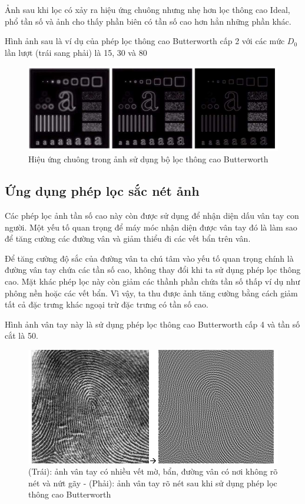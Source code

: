 \documentclass[12pt,a4paper]{report}
\numberwithin{equation}{section}
\theoremstyle{definition} %
\begin{document}
Ảnh sau khi lọc có xảy ra hiệu ứng chuông nhưng nhẹ hơn lọc thông cao Ideal, phổ tần số và ảnh cho thấy phần biên có tần số cao hơn hẳn những phần khác.

Hình ảnh sau là ví dụ của phép lọc thông cao Butterworth cấp 2 với các mức $D_0$ lần lượt (trái sang phải) là 15, 30 và 80

\begin{figure}[H]
\centering
\includegraphics[width=0.8\linewidth]{img/butterworthhighpass/vidu.png}
\caption{Hiệu ứng chuông trong ảnh sử dụng bộ lọc thông cao Butterworth}
\end{figure}

\subsection{Ứng dụng phép lọc sắc nét ảnh}
Các phép lọc ảnh tần số cao này còn được sử dụng để nhận diện dấu vân tay con người. Một yếu tố quan trọng để máy móc nhận diện được vân tay đó là làm sao để tăng cường các đường vân và giảm thiểu đi các vết bẩn trên vân. 

Để tăng cường độ sắc của đường vân ta chú tâm vào yếu tố quan trọng chính là đường vân tay chứa các tần số cao, không thay đổi khi ta sử dụng phép lọc thông cao. Mặt khác phép lọc này còn giảm các thầnh phần chứa tần số thấp ví dụ như phông nền hoặc các vết bẩn. Vì vậy, ta thu được ảnh tăng cường bằng cách giảm tất cả đặc trưng khác ngoại trừ đặc trưng có tần số cao.

Hình ảnh vân tay này là sử dụng phép lọc thông cao Butterworth cấp 4 và tần số cắt là 50.

\begin{figure}[H]
	\centering
	\includegraphics[width=0.88\linewidth]{img/ungdungsacanh/vantay.png}
	\caption{(Trái): ảnh vân tay có nhiều vết mờ, bẩn, đường vân có nơi không rõ nét và nứt gãy - (Phải): ảnh vân tay rõ nét sau khi sử dụng  phép lọc thông cao Butterworth}
\end{figure}
\end{document}
